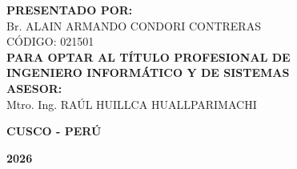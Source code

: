 \begin{titlepage}
\settowidth{\tesisx}{\normalsize\bfseries TESIS}%
\begin{flushleft}
\hspace*{\dimexpr0.5\textwidth-0.5\tesisx\relax}%
\begin{minipage}{\dimexpr0.5\textwidth+0.5\tesisx\relax}
\raggedright\fontsize{9}{11}\selectfont
{\bfseries PRESENTADO POR:}\\[4pt]
Br. ALAIN ARMANDO CONDORI CONTRERAS\\[4pt]
C{\'O}DIGO: 021501\\[16pt]
{\bfseries PARA OPTAR AL T{\'I}TULO PROFESIONAL DE}\\
{\bfseries INGENIERO INFORM{\'A}TICO Y DE SISTEMAS}\\[16pt]
{\bfseries ASESOR:}\\[4pt]
Mtro. Ing. RA{\'U}L HUILLCA HUALLPARIMACHI
\end{minipage}%
\end{flushleft}

\vspace{1.6cm}
{\bfseries CUSCO - PER{\'U}\par}
\vspace{0.2cm}
{\bfseries 2026\par}
\end{titlepage}
